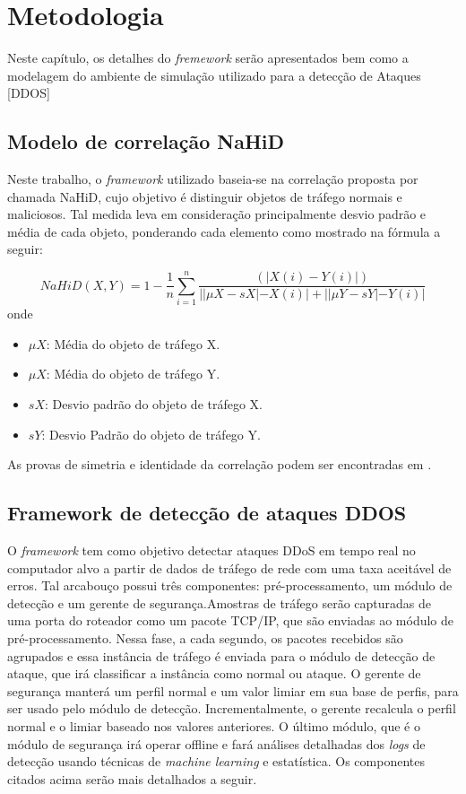 \chapter[Metodologia]{Metodologia}
\label{Simulacao}

Neste capítulo, os detalhes do \textit{fremework} serão apresentados bem como a modelagem do ambiente de simulação utilizado para a detecção de Ataques [DDOS]

\section{Modelo de correlação NaHiD}

Neste trabalho, o \textit{framework} utilizado baseia-se na correlação proposta por \cite{NHOQUE} chamada NaHiD, cujo objetivo é distinguir objetos de tráfego normais e maliciosos. Tal medida leva em consideração principalmente desvio padrão e média de cada objeto, ponderando cada elemento como mostrado na fórmula a seguir:  

\begin{equation}
	NaHiD(X,Y) = 1 - \frac{1}{n} \sum_{i=1}^{n} \frac{\left(|X(i) - Y(i)|\right)}{||\mu{X} - sX| - X(i)| + ||\mu{Y} - sY| - Y(i)|}
\end{equation}
onde
\begin{itemize}
	\item $\mu{X}$: Média do objeto de tráfego X.
 	\item $\mu{X}$: Média do objeto de tráfego Y.
	\item $sX$: Desvio padrão do objeto de tráfego X.
	\item $sY$: Desvio Padrão do objeto de tráfego Y.
\end{itemize}
As provas de simetria e identidade da correlação podem ser encontradas em \cite{NHOQUE}.

\section{Framework de detecção de ataques DDOS}
O \textit{framework} tem como objetivo detectar ataques DDoS em tempo real no computador alvo a partir de dados de tráfego de rede com uma taxa aceitável de erros. Tal arcabouço possui três componentes: pré-processamento, um módulo de detecção e um gerente de segurança.Amostras de tráfego serão capturadas de uma porta do roteador como um pacote TCP/IP, que são enviadas ao módulo de pré-processamento. Nessa fase, a cada segundo, os pacotes recebidos são agrupados e essa instância de tráfego é enviada para o módulo de detecção de ataque, que irá classificar a instância como normal ou ataque. O gerente de segurança manterá um perfil normal e um valor limiar em sua base de perfis, para ser usado pelo módulo de detecção. Incrementalmente, o gerente recalcula o perfil normal e o limiar baseado nos valores anteriores. O último módulo, que é o módulo de segurança irá operar offline e fará análises detalhadas dos \textit{logs} de detecção usando técnicas de \textit{machine learning} e estatística. Os componentes citados acima serão mais detalhados a seguir.
